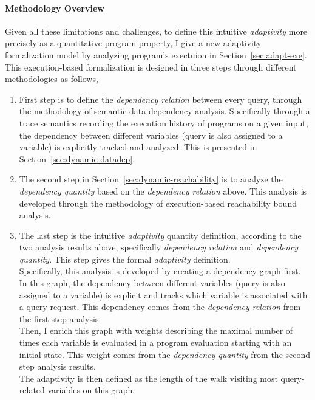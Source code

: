 \paragraph{Methodology Overview}
Given all these limitations and challenges,
to define this intuitive \emph{adaptivity} more precisely as a quantitative program property, 
I give a new adaptivity formalization model by analyzing program's exectuion in Section~\ref{sec:adapt-exe}.
 This execution-based formalization is designed in three steps through different methodologies as follows,
\begin{enumerate}
 \item First step is to define the \emph{dependency relation} between every query, 
 through the methodology of semantic data dependency analysis.
 Specifically through a trace semantics recording the execution history of programs on a given input,
 the dependency between different variables (query is also assigned to a variable) is explicitly tracked and 
 analyzed. This is presented in Section~\ref{sec:dynamic-datadep}.
 \item The second step in Section~\ref{sec:dynamic-reachability} is to analyze the \emph{dependency quantity} 
 based on the \emph{dependency relation} above.
 This analysis is developed through the methodology of execution-based reachability bound analysis.
 \item The last step is the intuitive \emph{adaptivity} quantity definition, 
 according to the two analysis results above, specifically \emph{dependency relation} and \emph{dependency quantity}.
 This step 
 gives the formal \emph{adaptivity} definition. 
 \\
 Specifically, this analysis is developed by creating a dependency graph first. 
 In this graph, the dependency between different variables (query is also assigned to a variable) 
 is explicit and tracks which variable is associated with a query request. 
 This dependency comes from the \emph{dependency relation} from the first step analysis.
 \\
 Then, I enrich this graph with 
 weights describing the maximal number of times each variable is evaluated in a program evaluation starting with an initial state. 
 This weight comes from the \emph{dependency quantity} from the second step analysis results.
 \\
 The adaptivity is then defined as the length of the walk visiting most query-related variables on this graph. 
 \end{enumerate}

